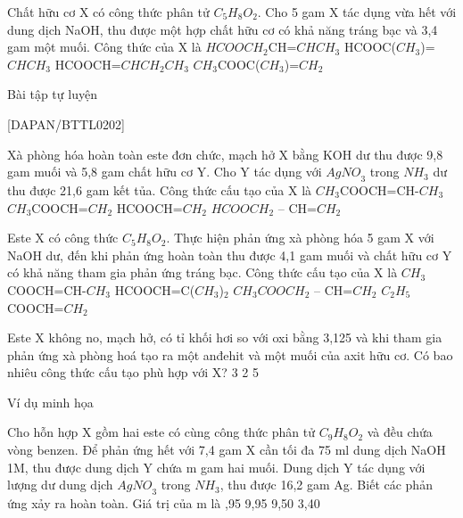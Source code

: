 \begin{vdex}[2]%
	Chất hữu cơ X có công thức phân tử ${C}_5{H}_8{O}_2$. Cho 5 gam X tác dụng vừa hết với dung dịch NaOH, thu được một hợp chất hữu cơ có khả năng tráng bạc và 3,4 gam một muối. Công thức của X là
	\choice
	{ ${HCOOCH}_2$CH=${CHCH}_3$}
	{ HCOOC(${CH}_3$)=${CHCH}_3$}
	{\True HCOOCH=${CHCH}_2{CH}_3$}
	{ ${CH}_3$COOC(${CH}_3$)=${CH}_2$}
	\huongdan{
	}
\end{vdex}
\begin{bttl}{Bài tập tự luyện}
\end{bttl}
[DAPAN/BTTL0202]
\begin{ex}[2]%
	Xà phòng hóa hoàn toàn este đơn chức, mạch hở X bằng KOH dư thu được 9,8 gam muối và 5,8 gam chất hữu cơ Y. Cho Y tác dụng với ${AgNO}_3$ trong ${NH}_3$ dư thu được 21,6 gam kết tủa. Công thức cấu tạo của X là
	\choice
	{\True ${CH}_3$COOCH=CH-${CH}_3$}
	{ ${CH}_3$COOCH=${CH}_2$}
	{ HCOOCH=${CH}_2$}
	{ ${HCOOCH}_2$ – CH=${CH}_2$}
	\sodongkeex[6]
\end{ex}

\begin{ex}[2]%
	Este X có công thức ${C}_5{H}_8{O}_2$. Thực hiện phản ứng xà phòng hóa 5 gam X với NaOH dư, đến khi phản ứng hoàn toàn thu được 4,1 gam muối và chất hữu cơ Y có khả năng tham gia phản ứng tráng bạc. Công thức cấu tạo của X là
	\choice
	{\True ${CH}_3$COOCH=CH-${CH}_3$}
	{ HCOOCH=C(${CH}_3$)${}_2$}
	{ ${CH}_3{COOCH}_2$ – CH=${CH}_2$}
	{ ${C}_2{H}_5$COOCH=${CH}_2$}
	\sodongkeex[6]
\end{ex}

\begin{ex}[2]%
Este X không no, mạch hở, có tỉ khối hơi so với oxi bằng 3,125 và khi tham gia phản ứng xà phòng hoá tạo ra một anđehit và một muối của axit hữu cơ. Có bao nhiêu công thức cấu tạo phù hợp với X?
	\choice
	{ 3}
	{ 2}
	{}
	{ 5}
	\sodongkeex[6]
\end{ex}



\begin{vdm}{Ví dụ minh họa}
\end{vdm}
	\begin{vdex}[3]%
	Cho hỗn hợp X gồm hai este có cùng công thức phân tử ${C}_9{H}_8{O}_2$ và đều chứa vòng benzen. Để phản ứng hết với 7,4 gam X cần tối đa 75 ml dung dịch NaOH 1M, thu được dung dịch Y chứa m gam hai muối. Dung dịch Y tác dụng với lượng dư dung dịch ${AgNO}_3$ trong ${NH}_3$, thu được 16,2 gam Ag. Biết các phản ứng xảy ra hoàn toàn. Giá trị của m là
	\choice
	{,95}
	{ 9,95}
	{ 9,50}
	{ 3,40}
	\huongdan{

	}
\end{vdex}

